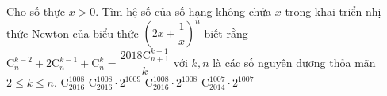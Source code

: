 \begin{ex}%
Cho số thực $x>0$. Tìm hệ số của số hạng không chứa $x$ trong khai triển nhị thức Newton của biểu thức $\left (2x+\dfrac{1}{x}\right )^n$ biết rằng $\mathrm{C}_n^{k-2} +2\mathrm{C}_n^{k-1}+\mathrm{C}_n^{k}=\dfrac{2018\mathrm{C}_{n+1}^{k-1}}{k}$  với $k,n$ là các số nguyên dương thỏa mãn $2 \leqslant k \leqslant n$. 
\choice
{$\mathrm{C}_{2016}^{1008}$}
{$\mathrm{C}_{2016}^{1008} \cdot 2^{1009}$}
{\True $\mathrm{C}_{2016}^{1008} \cdot 2^{1008}$}
{$\mathrm{C}_{2014}^{1007} \cdot 2^{1007}$}
\end{ex}

